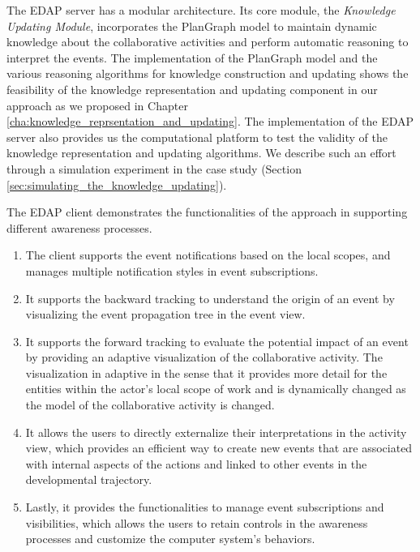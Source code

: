 The EDAP server has a modular architecture. Its core module, the \emph{Knowledge Updating Module}, incorporates the PlanGraph model to maintain dynamic knowledge about the collaborative activities and perform automatic reasoning to interpret the events. The implementation of the PlanGraph model and the various reasoning algorithms for knowledge construction and updating shows the feasibility of the knowledge representation and updating component in our approach as we proposed in Chapter \ref{cha:knowledge_reprsentation_and_updating}. The implementation of the EDAP server also provides us the computational platform to test the validity of the knowledge representation and updating algorithms. We describe such an effort through a simulation experiment in the case study (Section \ref{sec:simulating_the_knowledge_updating}).

The EDAP client demonstrates the functionalities of the approach in supporting different awareness processes. 
\begin{enumerate}
	\item The client supports the event notifications based on the local scopes, and manages  multiple notification styles in event subscriptions.
	\item It supports the backward tracking to understand the origin of an event by visualizing the event propagation tree in the event view.
	\item It supports the forward tracking to evaluate the potential impact of an event by providing an adaptive visualization of the collaborative activity. The visualization in adaptive in the sense that it provides more detail for the entities within the actor's local scope of work and is dynamically changed as the model of the collaborative activity is changed.
	\item It allows the users to directly externalize their interpretations in the activity view, which provides an efficient way to create new events that are associated with internal aspects of the actions and linked to other events in the developmental trajectory.
	\item Lastly, it provides the functionalities to manage event subscriptions and visibilities, which allows the users to retain controls in the awareness processes and customize the computer system's behaviors.
\end{enumerate}




 

